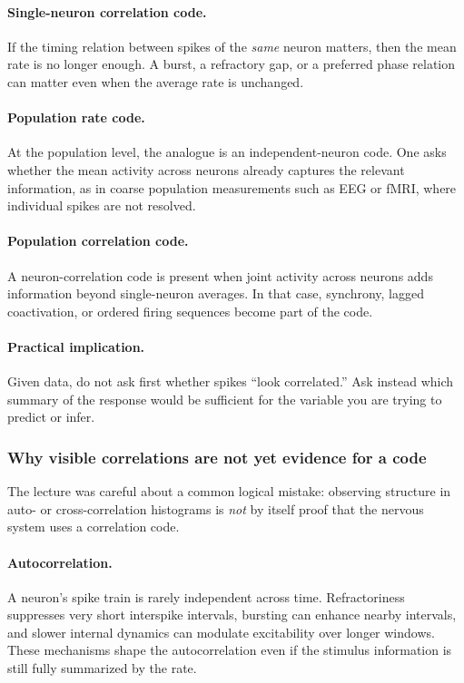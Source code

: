 \paragraph{Single-neuron correlation code.}
If the timing relation between spikes of the \emph{same} neuron matters, then the mean rate is no longer enough. A burst, a refractory gap, or a preferred phase relation can matter even when the average rate is unchanged.

\paragraph{Population rate code.}
At the population level, the analogue is an independent-neuron code. One asks whether the mean activity across neurons already captures the relevant information, as in coarse population measurements such as EEG or fMRI, where individual spikes are not resolved.

\paragraph{Population correlation code.}
A neuron-correlation code is present when joint activity across neurons adds information beyond single-neuron averages. In that case, synchrony, lagged coactivation, or ordered firing sequences become part of the code.

\paragraph{Practical implication.}
Given data, do not ask first whether spikes ``look correlated.'' Ask instead which summary of the response would be sufficient for the variable you are trying to predict or infer.

\subsubsection{Why visible correlations are not yet evidence for a code}

The lecture was careful about a common logical mistake: observing structure in auto- or cross-correlation histograms is \emph{not} by itself proof that the nervous system uses a correlation code.

\paragraph{Autocorrelation.}
A neuron's spike train is rarely independent across time. Refractoriness suppresses very short interspike intervals, bursting can enhance nearby intervals, and slower internal dynamics can modulate excitability over longer windows. These mechanisms shape the autocorrelation even if the stimulus information is still fully summarized by the rate.


